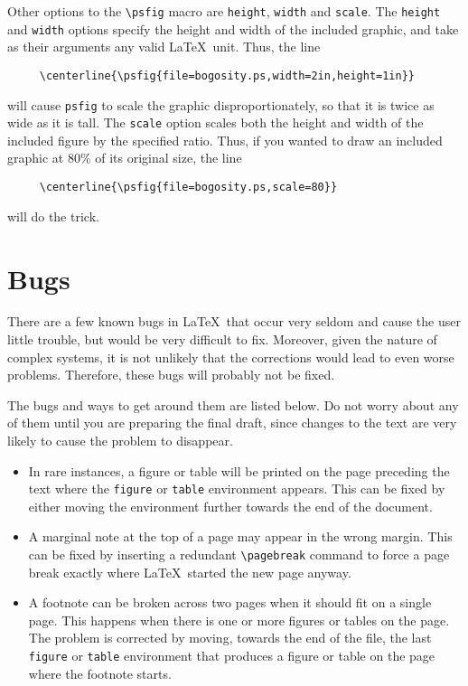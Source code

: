 Other options to the \verb|\psfig| macro are {\tt height}, 
{\tt width} and {\tt scale}.
The {\tt height} and {\tt width} options specify the height
and width of the included graphic, and take as their arguments
any valid \LaTeX\ unit.
Thus, the line 
\begin{verbatim}
     \centerline{\psfig{file=bogosity.ps,width=2in,height=1in}}
\end{verbatim}
will cause {\tt psfig} to scale the graphic disproportionately,
so that it is twice as wide as it is tall.
The {\tt scale} option scales both the height and width of the 
included figure by the specified ratio.  
Thus, if you wanted to draw an included graphic at 80\% of 
its original size, the line
\begin{verbatim}
     \centerline{\psfig{file=bogosity.ps,scale=80}}
\end{verbatim}
will do the trick.

\section{Bugs}

There are a few known bugs in \LaTeX\ that occur very seldom and
cause the user little trouble, but would be very difficult to fix.
Moreover, given the nature of complex systems, it is not unlikely that
the corrections would lead to even worse problems.  Therefore, these
bugs will probably not be fixed.  

The bugs and ways to get around them are listed below.  Do not worry
about any of them until you are preparing the final draft, since
changes to the text are very likely to cause the problem to disappear.
\begin{itemize}
\item In rare instances, a figure or table will be printed on the page
preceding the text where the {\tt figure} or {\tt table} environment
appears.  This can be fixed by either moving the environment further
towards the end of the document. 

\item A marginal note at the top of a page may appear in the wrong
margin.  This can be fixed by inserting a redundant \verb|\pagebreak|
command to force a page break exactly where \LaTeX\ started the new
page anyway.

\item A footnote can be broken across two pages when it should fit on a
single page.  This happens when there is one or more figures or tables
on the page.  The problem is corrected by moving, towards the end of the
file, the last {\tt figure} or {\tt table} environment that produces a
figure or table on the page where the footnote starts.
\end{itemize}






